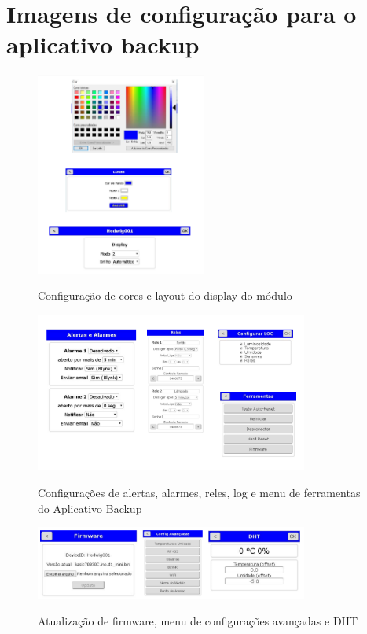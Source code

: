 \chapter{Imagens de configuração para o aplicativo backup}
\label{attachmentsImagensBackup}

\begin{figure}[H]
	\centering
	\caption{Configuração de cores e layout do display do módulo}
	\includegraphics[width=0.5\textwidth]{configCoresLayoutAppBackup}
	\label{fig:configCoresLayoutAppBackups}
\end{figure}

\begin{figure}[H]
	\centering
	\caption{Configurações de alertas, alarmes, reles, log e menu de ferramentas do Aplicativo Backup}
	\includegraphics[width=0.8\textwidth]{configalertasreleslogferramentas}
	\label{fig:configalertasreleslogferramentas}
\end{figure}

\begin{figure}[H]
	\centering
	\caption{Atualização de firmware, menu de configurações avançadas e DHT}
	\includegraphics[width=0.8\textwidth]{firmwareconfigavancadasDHT}
	\label{fig:firmwareconfigavancadasDHT}
\end{figure}

